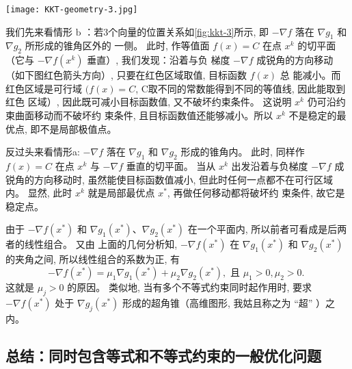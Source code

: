 \begin{FigureCenter}{}
    \label{fig:kkt-3}
    \texttt{[image: KKT-geometry-3.jpg]}
\end{FigureCenter}

我们先来看情形 $\mathrm{b}$ ：若3个向量的位置关系如\ref{fig:kkt-3}所示, 即 $-\nabla f$ 落在 $\nabla g_{1}$ 和 $\nabla g_{2}$ 所形成的锥角区外的 一侧。 此时, 作等值面 $f({x})=C$ 在点 ${x}^{k}$ 的切平面（它与 $-\nabla f\left({x}^{k}\right)$ 垂直）, 我们发现：沿着与负 梯度 $-\nabla f$ 成锐角的方向移动（如下图红色箭头方向）, 只要在红色区域取值, 目标函数 $f({x})$ 总 能减小。而红色区域是可行域 $(f({x})=C$, C取不同的常数能得到不同的等值线, 因此能取到红色 区域）, 因此既可减小目标函数值, 又不破坏约束条件。 这说明 ${x}^{k}$ 仍可沿约束曲面移动而不破坏约 束条件, 且目标函数值还能够减小。所以 ${x}^{k}$ 不是稳定的最优点, 即不是局部极值点。

反过头来看情形a: $ -\nabla f $ 落在 $ \nabla g_{1} $ 和 $ \nabla g_{2} $ 形成的锥角内。 此时, 同样作 $ f({x})=C $ 在点 $ {x}^{k} $ 与 $ -\nabla f $ 垂直的切平面。 当从 $ {x}^{k} $ 出发沿着与负梯度 $ -\nabla f $ 成锐角的方向移动时, 虽然能使目标函数值减小, 但此时任何一点都不在可行区域内。 显然, 此时 $ {x}^{k} $ 就是局部最优点 $ {x}^{*} $, 再做任何移动都将破坏约 束条件, 故它是稳定点。

由于 $ -\nabla f\left({x}^{*}\right) $ 和 $ \nabla g_{1}\left({x}^{*}\right) 、 \nabla g_{2}\left({x}^{*}\right) $ 在一个平面内, 所以前者可看成是后两者的线性组合。 又由 上面的几何分析知, $ -\nabla f\left({x}^{*}\right) $ 在 $ \nabla g_{1}\left({x}^{*}\right) $ 和 $ \nabla g_{2}\left({x}^{*}\right) $ 的夹角之间, 所以线性组合的系数为正, 有
$$
-\nabla f\left({x}^{*}\right)=\mu_{1} \nabla g_{1}\left({x}^{*}\right)+\mu_{2} \nabla g_{2}\left({x}^{*}\right), \text { 且 } \mu_{1}>0, \mu_{2}>0 \text {. }
$$
这就是 $ \mu_{j}>0 $ 的原因。 类似地, 当有多个不等式约束同时起作用时, 要求 $ -\nabla f\left({x}^{*}\right) $ 处于 $ \nabla g_{j}\left({x}^{*}\right) $ 形成的超角锥（高维图形, 我姑且称之为 “超” ）之内。

\subsection{总结：同时包含等式和不等式约束的一般优化问题}

